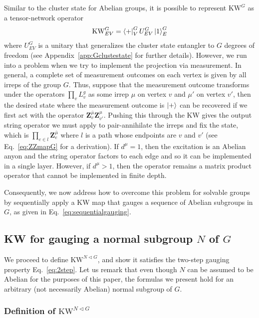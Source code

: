 \documentclass[nofootinbib,prx,twocolumn,showpacs,superscriptaddress,notitlepage,amsmath,amssymb]{revtex4-2}
\theoremstyle{definition}
\def\KW{\text{KW}}
\def\bra#1{\mathinner{\langle{#1}|}}
\def\ket#1{\mathinner{|{#1}\rangle}}
\def\bs#1{\boldsymbol{#1}}
\begin{document}
Similar to the cluster state for Abelian groups, it is possible to represent $\KW^G$ as a tensor-network operator
\begin{align}
    \KW^G_{EV} = \bra{+}^G_V U_{EV}^G \ket{1}^G_E
\end{align}
where $U_{EV}^G $ is a unitary that generalizes the cluster state entangler to $G$ degrees of freedom\cite{Brell2015} (see Appendix~\ref{app:Gclustestate} for further details). However, we run into a problem when we try to implement the projection via measurement. In general, a complete set of measurement outcomes on each vertex is given by all irreps of the group $G$. Thus, suppose that the measurement outcome transforms under the operators $\prod_v L^g_v$ as some irrep $\mu$ on vertex $v$ and $\mu'$ on vertex $v'$, then the desired state where the measurement outcome is $\ket{+}$ can be recovered if we first act with the operator $ \bs Z^{\bar \mu}_v \bs Z^{ \mu}_{v'}$. Pushing this through the KW gives the output string operator we must apply to pair-annihilate the irreps and fix the state, which is $\prod_{e \in l} \bs Z^{\bar \mu}_e$
where $l$ is a path whose endpoints are $v$ and $v'$ (see Eq.~\eqref{eq:ZZmapG} for a derivation). If $d^\mu=1$, then the excitation is an Abelian anyon and the string operator factors to each edge and so it can be implemented in a single layer. However, if $d^\mu >1$, then the operator remains a matrix product operator that cannot be implemented in finite depth. 

Consequently, we now address how to overcome this problem for solvable groups by sequentially apply a KW map that gauges a sequence of Abelian subgroups in $G$, as given in Eq.~\eqref{eq:sequentialgauging}.

\subsection{KW for gauging a normal subgroup $N$ of $G$}\label{sec:KWNinG}

We proceed to define $\KW^{N\triangleleft G}$, and show it satisfies the two-step gauging property Eq.~\eqref{eq:2step}. Let us remark that even though $N$ can be assumed to be Abelian for the purposes of this paper, the formulas we present hold for an arbitrary (not necessarily Abelian) normal subgroup of $G$.






\subsubsection{Definition of $\KW^{N \triangleleft G}$}
\end{document}
